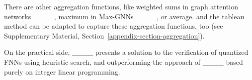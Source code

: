 There are other aggregation functions, like weighted sums in graph attention networks ____, maximum in Max-GNNs ____, or average. \thelogic{} and the tableau method can be adapted to capture these aggregation functions, too (see Supplementary Material, Section~\ref{appendix-section-aggregation}). 

On the practical side, ____ presents a solution to the verification of quantized FNNs using heuristic search, and outperforming the approach of ____ based purely on integer linear programming.